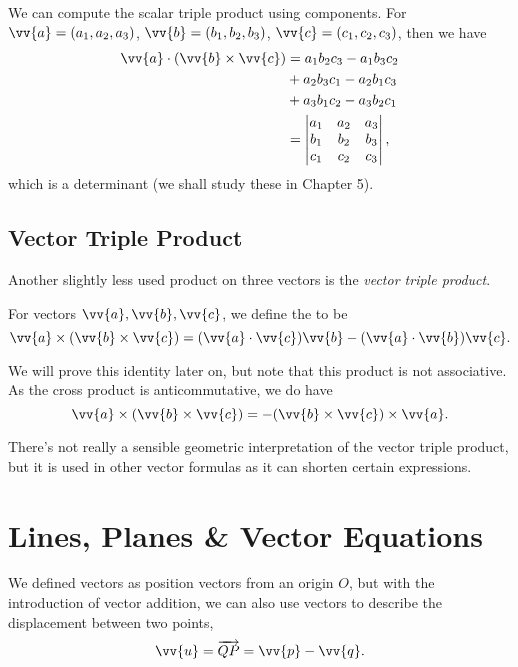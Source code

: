 We can compute the scalar triple product using components. For $\vv{a} = (a_1, a_2, a_3)$, $\vv{b} = (b_1, b_2, b_3)$, $\vv{c} = (c_1, c_2, c_3)$, then we have
\begin{align*}
    \vv{a} \cdot (\vv{b} \times \vv{c}) &= a_1 b_2 c_3 - a_1 b_3 c_2 \\
    & + a_2 b_3 c_1 - a_2 b_1 c_3 \\
    & + a_3 b_1 c_2 - a_3 b_2 c_1 \\
    &= \begin{vmatrix}
        a_1 & a_2 & a_3 \\
        b_1 & b_2 & b_3 \\
        c_1 & c_2 & c_3 
    \end{vmatrix},
\end{align*}
which is a determinant (we shall study these in Chapter 5).

\subsection{Vector Triple Product}

Another slightly less used product on three vectors is the \emph{vector triple product}.

\begin{definition}
    For vectors $\vv{a}, \vv{b}, \vv{c}$, we define the  to be
    $$
    \vv{a} \times(\vv{b} \times \vv{c})=(\vv{a} \cdot \vv{c}) \vv{b}-(\vv{a} \cdot \vv{b}) \vv{c}.
    $$
\end{definition}

We will prove this identity later on, but note that this product is not associative. As the cross product is anticommutative, we do have
$$
\vv{a} \times(\vv{b} \times \vv{c}) = - (\vv{b} \times \vv{c}) \times \vv{a}.
$$

There's not really a sensible geometric interpretation of the vector triple product, but it is used in other vector formulas as it can shorten certain expressions.

\section{Lines, Planes \& Vector Equations}

We defined vectors as position vectors from an origin $O$, but with the introduction of vector addition, we can also use vectors to describe the displacement between two points,
$$
\vv{u} = \overrightarrow{QP} = \vv{p} - \vv{q}.
$$

